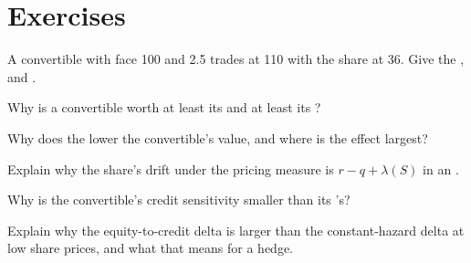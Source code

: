 \section{Exercises}

\begin{exercise}[$\star$]\label{exo:dv:convertibles-and-the-credit-equity-link:1}
A convertible with face 100 and  2.5 trades at 110 with the share at 36. Give the ,  and .
\end{exercise}

\begin{exercise}[$\star$]\label{exo:dv:convertibles-and-the-credit-equity-link:2}
Why is a convertible worth at least its  and at least its ?
\end{exercise}

\begin{exercise}[$\star$]\label{exo:dv:convertibles-and-the-credit-equity-link:3}
Why does the  lower the convertible's value, and where is the effect largest?
\end{exercise}

\begin{exercise}[$\star\star$]\label{exo:dv:convertibles-and-the-credit-equity-link:4}
Explain why the share's drift under the pricing measure is $r-q+\lambda(S)$ in an .
\end{exercise}

\begin{exercise}[$\star\star$]\label{exo:dv:convertibles-and-the-credit-equity-link:5}
Why is the convertible's credit sensitivity smaller than its 's?
\end{exercise}

\begin{exercise}[$\star\star$]\label{exo:dv:convertibles-and-the-credit-equity-link:6}
Explain why the equity-to-credit delta is larger than the constant-hazard delta at low share prices, and what that means for a hedge.
\end{exercise}

